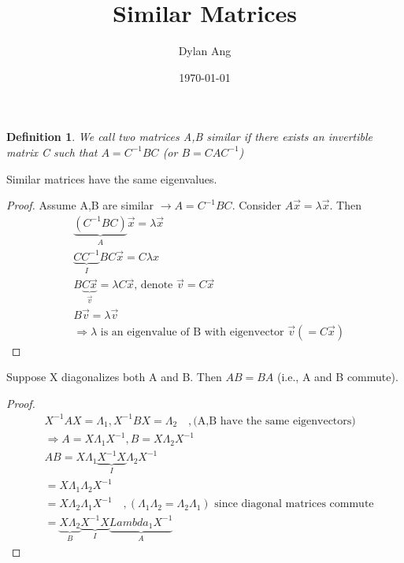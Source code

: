 \documentclass[12pt]{amsart}
\title{Similar Matrices}
\author{Dylan Ang}
\date{\today}
\newtheorem{definition}{Definition} %
\numberwithin{equation}{theorem}    %
\begin{document}
\maketitle

\begin{definition}
    We call two matrices A,B similar if there exists an invertible matrix C such that
    $A=C^{-1}BC$ (or $B=CAC^{-1}$)
\end{definition}

\begin{theorem}
    Similar matrices have the same eigenvalues.
\end{theorem}

\begin{proof}
    Assume A,B are similar $\rightarrow A=C^{-1}BC$. Consider $A\vec{x}=\lambda \vec{x}$. Then \begin{align*}
         & \underbrace{(C^{-1}BC)}_A \vec{x} = \lambda \vec{x}                                    \\
         & \underbrace{CC^{-1}}_I BC\vec{x} = C \lambda x                                         \\
         & B \underbrace{C\vec{x}}_{\vec{v}} = \lambda C\vec{x} \text{, denote } \vec{v}=C\vec{x} \\
         & B \vec{v} = \lambda \vec{v}                                                            \\
         & \Rightarrow \lambda \text{ is an eigenvalue of B with eigenvector } \vec{v}(=C\vec{x})
    \end{align*}
\end{proof}

\begin{theorem}
    Suppose X diagonalizes both A and B. Then $AB=BA$ (i.e., A and B commute).
\end{theorem}

\begin{proof}
    \begin{align*}
         & X^{-1} AX=\Lambda_1 , X^{-1}BX=\Lambda_2
        \quad ,\text{(A,B have the same eigenvectors)}                                                                             \\
         & \Rightarrow A = X\Lambda_1X^{-1} , B=X\Lambda_2 X^{-1}                                                                  \\
         & AB = X \Lambda_1 \underbrace{X^{-1} X}_I\Lambda_2 X^{-1}                                                                \\
         & = X\Lambda_1 \Lambda_2 X^{-1}                                                                                           \\
         & = X\Lambda_2 \Lambda_1 X^{-1} \quad ,(\Lambda_1 \Lambda_2 = \Lambda_2 \Lambda_1)\text{ since diagonal matrices commute} \\
         & = \underbrace{X \Lambda_2}_B \underbrace{X^{-1}X}_I \underbrace{Lambda_1 X^{-1}}_A
    \end{align*}
\end{proof}
\end{document}
